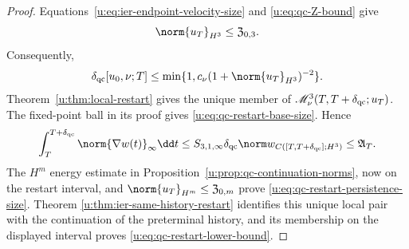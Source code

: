 \begin{proof}
Equations~\eqref{u:eq:ier-endpoint-velocity-size} and
\eqref{u:eq:qc-Z-bound} give
\[
 \norm{u_T}_{H^3}\le\mathfrak Z_{0,3}.
\]
Consequently,
\[
 \delta_{\rm qc}[u_0,\nu;T]
 \le\min\{1,c_\nu(1+\norm{u_T}_{H^3})^{-2}\}.
\]
Theorem~\ref{u:thm:local-restart} gives the unique member of
\(\mathscr M_\nu^3(T,T+\delta_{\rm qc};u_T)\).  The fixed-point ball in its
proof gives
\eqref{u:eq:qc-restart-base-size}.  Hence
\[
 \int_T^{T+\delta_{\rm qc}}\norm{\nabla w(t)}_\infty\dd t
 \le S_{3,1,\infty}\delta_{\rm qc}
 \norm w_{C([T,T+\delta_{\rm qc}];H^3)}
 \le\mathfrak A_T.
\]
The \(H^m\) energy estimate in
Proposition~\ref{u:prop:qc-continuation-norms}, now on the restart interval,
and \(\norm{u_T}_{H^m}\le\mathfrak Z_{0,m}\) prove
\eqref{u:eq:qc-restart-persistence-size}.  Theorem
\ref{u:thm:ier-same-history-restart} identifies this unique local pair with the
continuation of the preterminal history, and its membership on the displayed
interval proves \eqref{u:eq:qc-restart-lower-bound}.
\end{proof}

